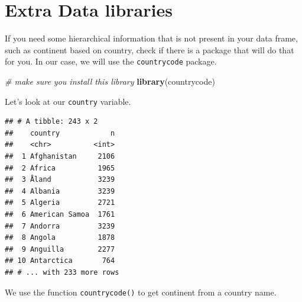 \documentclass[
]{book}
\newenvironment{Shaded}{\begin{snugshade}}{\end{snugshade}}
\newcommand{\CommentTok}[1]{\textcolor[rgb]{0.56,0.35,0.01}{\textit{#1}}}
\newcommand{\DataTypeTok}[1]{\textcolor[rgb]{0.13,0.29,0.53}{#1}}
\newcommand{\KeywordTok}[1]{\textcolor[rgb]{0.13,0.29,0.53}{\textbf{#1}}}
\newcommand{\NormalTok}[1]{#1}
\newcommand{\OperatorTok}[1]{\textcolor[rgb]{0.81,0.36,0.00}{\textbf{#1}}}
\newcommand{\StringTok}[1]{\textcolor[rgb]{0.31,0.60,0.02}{#1}}
\begin{document}
\hypertarget{extra-data-libraries}{%
\section{Extra Data libraries}\label{extra-data-libraries}}

If you need some hierarchical information that is not present in your data frame, such as continent based on country, check if there is a package that will do that for you. In our case, we will use the \texttt{countrycode} package.

\begin{Shaded}
\begin{Highlighting}[]
\CommentTok{# make sure you install this library}
\KeywordTok{library}\NormalTok{(countrycode)}
\end{Highlighting}
\end{Shaded}

Let's look at our \texttt{country} variable.

\begin{Shaded}
\end{Shaded}

\begin{verbatim}
## # A tibble: 243 x 2
##    country            n
##    <chr>          <int>
##  1 Afghanistan     2106
##  2 Africa          1965
##  3 Åland           3239
##  4 Albania         3239
##  5 Algeria         2721
##  6 American Samoa  1761
##  7 Andorra         3239
##  8 Angola          1878
##  9 Anguilla        2277
## 10 Antarctica       764
## # ... with 233 more rows
\end{verbatim}

We use the function \texttt{countrycode()} to get continent from a country name.

\begin{Shaded}
\end{Shaded}
\end{document}
